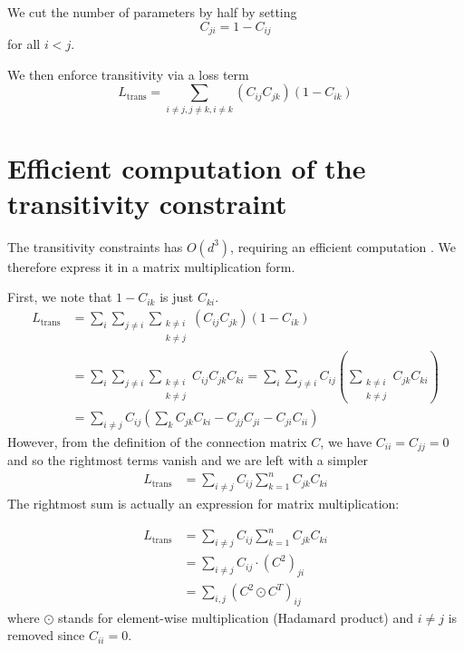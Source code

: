 \documentclass{article}
\begin{document}
We cut the number of parameters by half by setting
$$C_{ji} = 1-C_{ij}$$ for all $i<j$.

We then enforce transitivity via a loss term
$$L_\text{trans} = \sum_{i\neq j, j\neq k, i\neq k} (C_{ij}C_{jk})(1-C_{ik})$$

\section{Efficient computation of the transitivity constraint}

The transitivity constraints has $O(d^3)$, requiring an efficient computation
. We therefore express it in a matrix multiplication form.

First, we note that $1 - C_{ik}$ is just $C_{ki}$.
\begin{align*}
    L_{\text{trans}} & =
    \sum_i
    \sum_{j \ne i}
    \sum_{\substack{k \ne i \\ k \ne j}} (C_{ij}C_{jk})(1-C_{ik})\\
    & =
    \sum_i
    \sum_{j \ne i}
    \sum_{\substack{k \ne i \\ k \ne j}} C_{ij}C_{jk}C_{ki} =
    \sum_i
    \sum_{j \ne i} C_{ij} \left(
    \sum_{\substack{k \ne i \\ k \ne j}}C_{jk}C_{ki} \right) \\
    & =
    \sum_{i \ne j} C_{ij} \left(
    \sum_k C_{jk} C_{ki} - C_{jj}C_{ji} - C_{ji} C_{ii}
    \right)
\end{align*}
However, from the definition of the connection matrix $C$, we have $C_{ii} = C_{jj} = 0$ and so the rightmost terms vanish and we are left with a simpler
\begin{align*}
    L_{\text{trans}} & =
    \sum_{i \ne j} C_{ij}
    \sum_{k=1}^n C_{jk} C_{ki}
\end{align*}
The rightmost sum is actually an expression for matrix multiplication:

\begin{align*}
    L_{\text{trans}} & =
    \sum_{i \ne j} C_{ij}
    \sum_{k=1}^n C_{jk} C_{ki} \\
    & =
    \sum_{i \ne j} C_{ij} \cdot (C^2)_{ji} \\
    & =
    \sum_{i, j} (C^2 \odot C^T)_{ij}
\end{align*}
where $\odot$ stands for element-wise multiplication (Hadamard product) and $i \ne j$ is removed since $C_{ii} = 0$.
\end{document}
